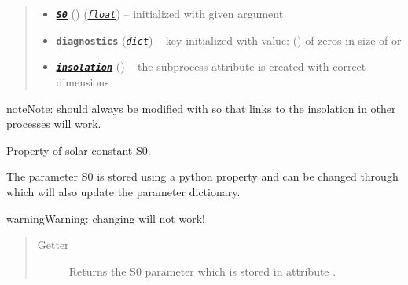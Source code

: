 \documentclass[a4paper,10pt,english]{sphinxmanual}
\begin{document}
\begin{fulllineitems}
\begin{quote}
\begin{description}
\begin{itemize}
\item {} 
{\hyperref[api/climlab.radiation:climlab.radiation.insolation._Insolation.S0]{\emph{\textbf{\texttt{S0}}}}} () (\href{http://docs.python.org/2.7/library/functions.html\#float}{\emph{\texttt{float}}}) -- initialized with given argument 

\item {} 
\textbf{\texttt{diagnostics}} (\href{http://docs.python.org/2.7/library/stdtypes.html\#dict}{\emph{\texttt{dict}}}) -- key  initialized with value:
{\hyperref[api/climlab.domain:climlab.domain.field.Field]{\emph{}}} () of zeros
in size of  or

\item {} 
{\hyperref[api/climlab.radiation:climlab.radiation.insolation.P2Insolation.insolation]{\emph{\textbf{\texttt{insolation}}}}} () -- the subprocess attribute  is
created with correct dimensions

\end{itemize}

\end{description}\end{quote}

\begin{notice}{note}{Note:}
 should always be modified with 
 so that links to the insolation in other
processes will work.
\end{notice}

\begin{fulllineitems}
\label{api/climlab.radiation:climlab.radiation.insolation._Insolation.S0}
Property of solar constant S0.

The parameter S0 is stored using a python property and can be changed through 
 which will also update the parameter dictionary.

\begin{notice}{warning}{Warning:}
changing  will not work!
\end{notice}
\begin{quote}\begin{description}
\item[{Getter}] \leavevmode
Returns the S0 parameter which is stored in attribute .


\end{description}
\end{quote}
\end{fulllineitems}
\end{fulllineitems}
\end{document}

